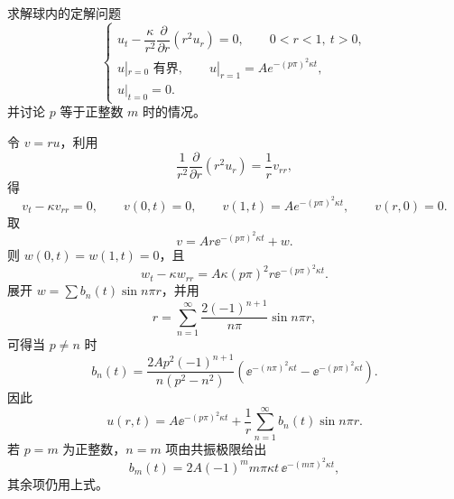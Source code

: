 \begin{question}
求解球内的定解问题
\[
\begin{cases}
u_t-\dfrac{\kappa}{r^2}\dfrac{\partial}{\partial r}\left(r^2u_r\right)=0,\qquad 0<r<1,\ t>0,\\
u|_{r=0}\text{ 有界},\qquad u|_{r=1}=Ae^{-(p\pi)^2\kappa t},\\
u|_{t=0}=0.
\end{cases}
\]
并讨论 \(p\) 等于正整数 \(m\) 时的情况。
\begin{solution}
令 \(v=ru\)，利用
\[
\frac1{r^2}\frac{\partial}{\partial r}(r^2u_r)=\frac1r v_{rr},
\]
得
\[
v_t-\kappa v_{rr}=0,\qquad v(0,t)=0,\qquad v(1,t)=Ae^{-(p\pi)^2\kappa t},\qquad v(r,0)=0.
\]
取
\[
v=A r \ee^{-(p\pi)^2\kappa t}+w.
\]
则 \(w(0,t)=w(1,t)=0\)，且
\[
w_t-\kappa w_{rr}=A\kappa(p\pi)^2r \ee^{-(p\pi)^2\kappa t}.
\]
展开 \(w=\sum b_n(t)\sin n\pi r\)，并用
\[
r=\sum_{n=1}^{\infty}\frac{2(-1)^{n+1}}{n\pi}\sin n\pi r,
\]
可得当 \(p\ne n\) 时
\[
b_n(t)=\frac{2A p^2(-1)^{n+1}}{n(p^2-n^2)}
\left(\ee^{-(n\pi)^2\kappa t}-\ee^{-(p\pi)^2\kappa t}\right).
\]
因此
\[
u(r,t)=A \ee^{-(p\pi)^2\kappa t}
+\frac1r\sum_{n=1}^{\infty}b_n(t)\sin n\pi r.
\]
若 \(p=m\) 为正整数，\(n=m\) 项由共振极限给出
\[
b_m(t)=2A(-1)^m m\pi\kappa t\,\ee^{-(m\pi)^2\kappa t},
\]
其余项仍用上式。
\end{solution}
\end{question}

